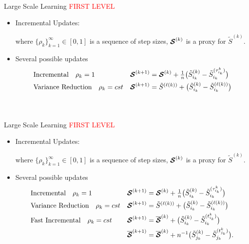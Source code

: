 \documentclass[10pt]{beamer}
\begin{document}
\begin{frame}{Large Scale Learning}
\textcolor{red}{FIRST LEVEL}
\begin{itemize}
\item Incremental Updates:
\begin{center}
\end{center}
where $\{ \rho_{k} \}_{k=1}^\infty \in [0,1]$ is a sequence of step sizes, ${\bm{\mathcal{S}}}^{(k)}$ is a proxy for $\tilde{S}^{(k)}$.
\item Several possible updates
\begin{align}
& \textrm{Incremental} \quad \rho_k = 1 & {\bm{\mathcal{S}}}^{(k+1)} &= {\bm{\mathcal{S}}}^{(k)} + {\textstyle \frac{1}{n}}\big( \tilde{S}_{i_k}^{(k)}  - \tilde{S}_{i_k}^{(\tau_{i_k}^k)} \big)\notag\\
& \textrm{Variance Reduction} \quad \rho_k = cst & {\bm{\mathcal{S}}}^{(k+1)} &= \tilde{S}^{(\ell(k))} +  \big( \tilde{S}_{i_k}^{(k)}  -\tilde{S}_{i_k}^{(\ell(k))}\big)  \notag\\
&    &&\notag\\
&    &&\notag
\end{align}
\end{itemize}
\end{frame}


\begin{frame}{Large Scale Learning}
\textcolor{red}{FIRST LEVEL}
\begin{itemize}
\item Incremental Updates:
\begin{center}
\end{center}
where $\{ \rho_{k} \}_{k=1}^\infty \in [0,1]$ is a sequence of step sizes, ${\bm{\mathcal{S}}}^{(k)}$ is a proxy for $\tilde{S}^{(k)}$.
\item Several possible updates
\begin{align}
& \textrm{Incremental} \quad \rho_k = 1 & {\bm{\mathcal{S}}}^{(k+1)} &= {\bm{\mathcal{S}}}^{(k)} + {\textstyle \frac{1}{n}}\big( \tilde{S}_{i_k}^{(k)}  - \tilde{S}_{i_k}^{(\tau_{i_k}^k)} \big)\notag\\
& \textrm{Variance Reduction} \quad \rho_k = cst & {\bm{\mathcal{S}}}^{(k+1)} &= \tilde{S}^{(\ell(k))} +  \big( \tilde{S}_{i_k}^{(k)}  -\tilde{S}_{i_k}^{(\ell(k))}\big)  \notag\\
& \textrm{Fast Incremental} \quad \rho_k = cst &{\bm{\mathcal{S}}}^{(k+1)} &= \overline{{\bm{\mathcal{S}}}}^{(k)} + \big( \tilde{S}_{i_k}^{(k)}  - \tilde{S}_{i_k}^{(t_{i_k}^k)} \big)\notag\\
&    &\overline{{\bm{\mathcal{S}}}}^{(k+1)} &= \overline{{\bm{\mathcal{S}}}}^{(k)} + n^{-1} \big( \tilde{S}_{j_k}^{(k)}  - \tilde{S}_{j_k}^{(t_{j_k}^k)} \big).\notag
\end{align}
\end{itemize}
\end{frame}
\end{document}
